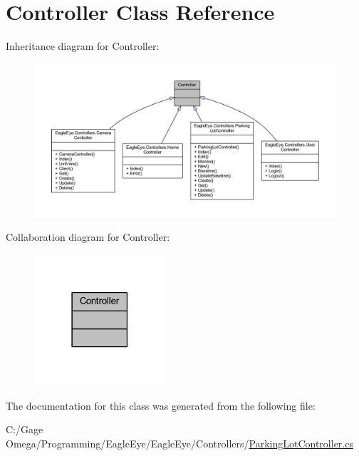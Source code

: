 \hypertarget{class_controller}{}\section{Controller Class Reference}
\label{class_controller}


Inheritance diagram for Controller\+:
\nopagebreak
\begin{figure}[H]
\begin{center}
\leavevmode
\includegraphics[width=350pt]{class_controller__inherit__graph}
\end{center}
\end{figure}


Collaboration diagram for Controller\+:\nopagebreak
\begin{figure}[H]
\begin{center}
\leavevmode
\includegraphics[width=138pt]{class_controller__coll__graph}
\end{center}
\end{figure}


The documentation for this class was generated from the following file\+:\begin{DoxyCompactItemize}
\item 
C\+:/\+Gage Omega/\+Programming/\+Eagle\+Eye/\+Eagle\+Eye/\+Controllers/\mbox{\hyperlink{_parking_lot_controller_8cs}{Parking\+Lot\+Controller.\+cs}}\end{DoxyCompactItemize}

